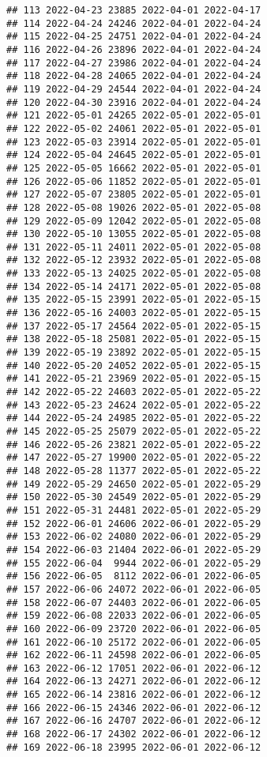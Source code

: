 \documentclass[
]{article}
\begin{document}
\begin{verbatim}
## 113 2022-04-23 23885 2022-04-01 2022-04-17
## 114 2022-04-24 24246 2022-04-01 2022-04-24
## 115 2022-04-25 24751 2022-04-01 2022-04-24
## 116 2022-04-26 23896 2022-04-01 2022-04-24
## 117 2022-04-27 23986 2022-04-01 2022-04-24
## 118 2022-04-28 24065 2022-04-01 2022-04-24
## 119 2022-04-29 24544 2022-04-01 2022-04-24
## 120 2022-04-30 23916 2022-04-01 2022-04-24
## 121 2022-05-01 24265 2022-05-01 2022-05-01
## 122 2022-05-02 24061 2022-05-01 2022-05-01
## 123 2022-05-03 23914 2022-05-01 2022-05-01
## 124 2022-05-04 24645 2022-05-01 2022-05-01
## 125 2022-05-05 16662 2022-05-01 2022-05-01
## 126 2022-05-06 11852 2022-05-01 2022-05-01
## 127 2022-05-07 23805 2022-05-01 2022-05-01
## 128 2022-05-08 19026 2022-05-01 2022-05-08
## 129 2022-05-09 12042 2022-05-01 2022-05-08
## 130 2022-05-10 13055 2022-05-01 2022-05-08
## 131 2022-05-11 24011 2022-05-01 2022-05-08
## 132 2022-05-12 23932 2022-05-01 2022-05-08
## 133 2022-05-13 24025 2022-05-01 2022-05-08
## 134 2022-05-14 24171 2022-05-01 2022-05-08
## 135 2022-05-15 23991 2022-05-01 2022-05-15
## 136 2022-05-16 24003 2022-05-01 2022-05-15
## 137 2022-05-17 24564 2022-05-01 2022-05-15
## 138 2022-05-18 25081 2022-05-01 2022-05-15
## 139 2022-05-19 23892 2022-05-01 2022-05-15
## 140 2022-05-20 24052 2022-05-01 2022-05-15
## 141 2022-05-21 23969 2022-05-01 2022-05-15
## 142 2022-05-22 24603 2022-05-01 2022-05-22
## 143 2022-05-23 24624 2022-05-01 2022-05-22
## 144 2022-05-24 24985 2022-05-01 2022-05-22
## 145 2022-05-25 25079 2022-05-01 2022-05-22
## 146 2022-05-26 23821 2022-05-01 2022-05-22
## 147 2022-05-27 19900 2022-05-01 2022-05-22
## 148 2022-05-28 11377 2022-05-01 2022-05-22
## 149 2022-05-29 24650 2022-05-01 2022-05-29
## 150 2022-05-30 24549 2022-05-01 2022-05-29
## 151 2022-05-31 24481 2022-05-01 2022-05-29
## 152 2022-06-01 24606 2022-06-01 2022-05-29
## 153 2022-06-02 24080 2022-06-01 2022-05-29
## 154 2022-06-03 21404 2022-06-01 2022-05-29
## 155 2022-06-04  9944 2022-06-01 2022-05-29
## 156 2022-06-05  8112 2022-06-01 2022-06-05
## 157 2022-06-06 24072 2022-06-01 2022-06-05
## 158 2022-06-07 24403 2022-06-01 2022-06-05
## 159 2022-06-08 22033 2022-06-01 2022-06-05
## 160 2022-06-09 23720 2022-06-01 2022-06-05
## 161 2022-06-10 25172 2022-06-01 2022-06-05
## 162 2022-06-11 24598 2022-06-01 2022-06-05
## 163 2022-06-12 17051 2022-06-01 2022-06-12
## 164 2022-06-13 24271 2022-06-01 2022-06-12
## 165 2022-06-14 23816 2022-06-01 2022-06-12
## 166 2022-06-15 24346 2022-06-01 2022-06-12
## 167 2022-06-16 24707 2022-06-01 2022-06-12
## 168 2022-06-17 24302 2022-06-01 2022-06-12
## 169 2022-06-18 23995 2022-06-01 2022-06-12

\end{verbatim}
\end{document}
